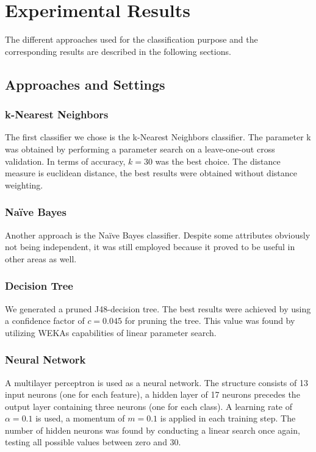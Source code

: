 \section{Experimental Results}
The different approaches used for the classification purpose and the corresponding results are described in the following sections.

\subsection{Approaches and Settings}

\subsubsection*{k-Nearest Neighbors}
The first classifier we chose is the k-Nearest Neighbors classifier. The
parameter k was obtained by performing a parameter search on a
leave-one-out cross validation. In terms of accuracy, \(k=30\) was
the best choice. The distance measure is euclidean distance, the best
results were obtained without distance weighting.

\subsubsection*{Na\"ive Bayes}
Another approach is the Na\"ive Bayes classifier. Despite some
attributes obviously not being independent, it was still employed
because it proved to be useful in other areas as well.

\subsubsection*{Decision Tree}
We generated a pruned J48-decision tree. The best results were
achieved by using a confidence factor of \(c=0.045\) for pruning the
tree. This value was found by utilizing WEKAs capabilities of linear
parameter search.

\subsubsection*{Neural Network}
A multilayer perceptron is used as a neural network. The structure
consists of 13 input neurons (one for each feature), a hidden layer
of 17 neurons precedes the output layer containing three neurons
(one for each class). A learning rate of \(\alpha=0.1\) is used, a momentum of
\(m=0.1\) is applied in each training step. The number of hidden
neurons was found by conducting a linear search once again, testing
all possible values between zero and 30.

